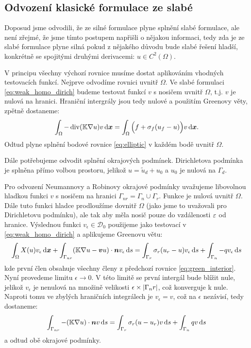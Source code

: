 \subsection{Odvození klasické formulace ze slabé}
Doposud jsme odvodili, že ze silné formulace plyne splnění slabé formulace, ale není zřejmé, že jsme 
tímto postupem napřišli o nějakou informaci, tedy zda je ze slabé formulace plyne silná pokud 
z nějakého důvodu bude slabé řešení hladší, konkrétně se spojitými druhými derivacemi: $u\in C^2(\Omega)$.

V principu všechny výchozí rovnice musíme dostat aplikováním vhodných testovacích funkcí. 
Nejprve odvodíme rovnici uvnitř $\Omega$. Ve slabé formulaci  \eqref{eq:weak_homo_dirich} 
budeme testovat funkcí $v$ s nosičem uvnitř $\Omega$, t.j. $v$ je nulová na hranici. 
Hraniční intergrály jsou tedy nulové a použitím Greenovy věty, zpětně dostaneme:
\begin{equation}
    \label{eq:green_interior}
    \int_\Omega -\operatorname{div} ({\mathbb{K}}\nabla u) v \,{\rm d} \mathbf{\boldsymbol{x}} = \int_\Omega \Big(f + \sigma_f (u_f - u)\Big)v \,{\rm d} \mathbf{\boldsymbol{x}}.
\end{equation}
Odtud plyne splnění bodové rovnice \eqref{eq:elliptic} v každém bodě uvnitř $\Omega$.

Dále potřebujeme odvodit splnění okrajových podmínek. Dirichletova podmínka je splněna přímo volbou prostoru, 
jelikož $u=\tilde u_d + u_0$ a $u_0$ je nulová na $\Gamma_d$.

Pro odvození Neumannovy a Robinovy okrajové podmínky uvažujeme libovolnou hladkou
 funkci $v$ s nosičem na hranici $\Gamma_{nr} =\Gamma_n \cup \Gamma_r$. 
Funkce je nulová uvnitř $\Omega$.
Dále tuto funkci hladce prodloužíme dovnitř  $\Omega$ (jako jsme to uvažovali pro Dirichletovu podmínku),
ale tak aby měla nosič pouze do vzdálenosti $\varepsilon$ od hranice. Výslednou funkci  $v_\epsilon \in \mathcal D_0$
použijeme jako testovací v \eqref{eq:weak_homo_dirich} a aplikujeme Greenovu větu:
\[
    \int_\Omega X(u)v_\epsilon \,{\rm d} \mathbf{\boldsymbol{x}} + \int_{\Gamma_{nr}} ({\mathbb{K}}\nabla u-\mathbf{\boldsymbol{v}} u)\cdot \mathbf{\boldsymbol{n}} v_\epsilon \,{\rm d} s    
              =  \int_{\Gamma_r} \sigma_r (u_r -u) v_\epsilon \,{\rm d} s + \int_{\Gamma_n} -q v_\epsilon \,{\rm d} s 
\]
kde první člen obsahuje všechny členy z předchozí rovnice \eqref{eq:green_interior}. 
Nyní provedeme limitu $\epsilon \to 0$. V této limitě se první intergál 
bude blížit nule, jelikož $v_\epsilon$ je nenulová na množině velikosti $\epsilon \times \lvert\Gamma_nr\rvert$, 
což konverguje k nule. Naproti tomu ve zbylých 
hraničních integrálech je $v_\epsilon = v$, což na $\epsilon$ nezávisí, tedy dostaneme:
\[
    \int_{\Gamma_{nr}} -({\mathbb{K}}\nabla u)\cdot \mathbf{\boldsymbol{n}} v \,{\rm d} s  
              =  \int_{\Gamma_r} \sigma_r (u -u_r) v \,{\rm d} s + \int_{\Gamma_n} q v \,{\rm d} s 
\]
a odtud obě okrajové podmínky.


